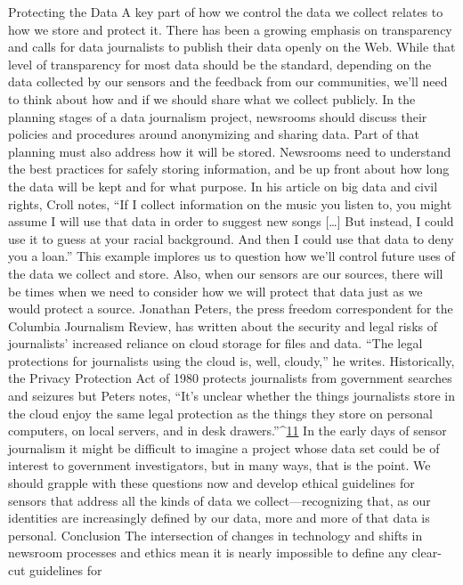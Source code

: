 Protecting the Data
A key part of how we control the data we collect relates to how we store and
protect it. There has been a growing emphasis on transparency and calls for
data journalists to publish their data openly on the Web. While that level
of transparency for most data should be the standard, depending on the
data collected by our sensors and the feedback from our communities, we'll
need to think about how and if we should share what we collect publicly. In
the planning stages of a data journalism project, newsrooms should discuss
their policies and procedures around anonymizing and sharing data.
Part of that planning must also address how it will be stored. Newsrooms
need to understand the best practices for safely storing information, and
be up front about how long the data will be kept and for what purpose.
In his article on big data and civil rights, Croll notes, ``If I collect information on the music you listen to, you might assume I will use that data in
order to suggest new songs [\ldots] But instead, I could use it to guess at your
racial background. And then I could use that data to deny you a loan.'' This
example implores us to question how we'll control future uses of the data
we collect and store.
Also, when our sensors are our sources, there will be times when we need to
consider how we will protect that data just as we would protect a source.
Jonathan Peters, the press freedom correspondent for the Columbia Journalism
Review, has written about the security and legal risks of journalists'
increased reliance on cloud storage for files and data. ``The legal protections
for journalists using the cloud is, well, cloudy,'' he writes. Historically, the
Privacy Protection Act of 1980 protects journalists from government
searches and seizures but Peters notes, ``It's unclear whether the things journalists
store in the cloud enjoy the same legal protection as the things they
store on personal computers, on local servers, and in desk drawers.''^{\href{#endnotes-stearns}{11}}
In the early days of sensor journalism it might be difficult to imagine a project
whose data set could be of interest to government investigators, but in
many ways, that is the point. We should grapple with these questions now
and develop ethical guidelines for sensors that address all the kinds of data
we collect—recognizing that, as our identities are increasingly defined by
our data, more and more of that data is personal.
Conclusion
The intersection of changes in technology and shifts in newsroom processes
and ethics mean it is nearly impossible to define any clear-cut guidelines for

